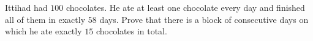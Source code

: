 Ittihad had $100$ chocolates. He ate at least one chocolate every day and finished all of them in exactly $58$ days. Prove that there is a block of consecutive days on which he ate exactly $15$ chocolates in total.
